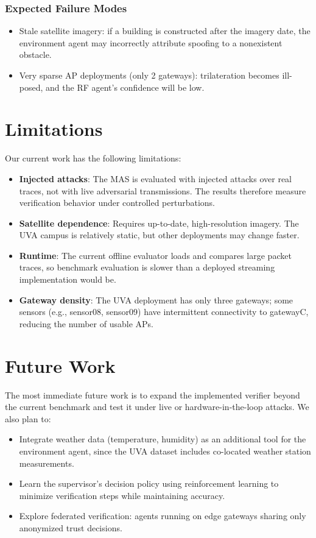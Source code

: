 \documentclass[10pt, twocolumn, letterpaper]{article}
\begin{document}
\subsubsection{Expected Failure Modes}
\begin{itemize}
    \item Stale satellite imagery: if a building is constructed after the imagery date, the environment agent may incorrectly attribute spoofing to a nonexistent obstacle.
    \item Very sparse AP deployments (only 2 gateways): trilateration becomes ill-posed, and the RF agent's confidence will be low.
\end{itemize}

\section{Limitations}

Our current work has the following limitations:
\begin{itemize}
    \item \textbf{Injected attacks}: The MAS is evaluated with injected attacks over real traces, not with live adversarial transmissions. The results therefore measure verification behavior under controlled perturbations.
    \item \textbf{Satellite dependence}: Requires up-to-date, high-resolution imagery. The UVA campus is relatively static, but other deployments may change faster.
    \item \textbf{Runtime}: The current offline evaluator loads and compares large packet traces, so benchmark evaluation is slower than a deployed streaming implementation would be.
    \item \textbf{Gateway density}: The UVA deployment has only three gateways; some sensors (e.g., sensor08, sensor09) have intermittent connectivity to gatewayC, reducing the number of usable APs.
\end{itemize}

\section{Future Work}

The most immediate future work is to expand the implemented verifier beyond the current benchmark and test it under live or hardware-in-the-loop attacks. We also plan to:

\begin{itemize}
    \item Integrate weather data (temperature, humidity) as an additional tool for the environment agent, since the UVA dataset includes co-located weather station measurements.
    \item Learn the supervisor's decision policy using reinforcement learning to minimize verification steps while maintaining accuracy.
    \item Explore federated verification: agents running on edge gateways sharing only anonymized trust decisions.
\end{itemize}
\end{document}
